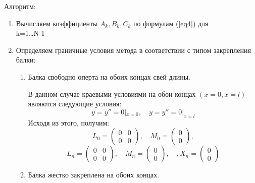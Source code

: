 	\bigskip\quad Алгоритм:
	\begin{enumerate}
		\item Вычисляем коэффициенты \(A_k,B_k,C_k\) по формулам (\ref{eq4}) для\\ k=1\ldots N-1
		\item Определяем граничные условия метода в соответствии с типом закрепления балки:
		\begin{enumerate}
			\item Балка свободно оперта на обоих концах свей длины.
			
			В данном случае краевыми условиями на обои концах \((x=0,x=l)\) являются следующие условия:
			\begin{equation*}
			y=y''=0|_{x=0}, \quad y=y''=0|_{x=l}
			\end{equation*}
			Исходя из этого, получим:
			\begin{equation*}
			L_0=\left( \begin{matrix}0&0\\0&0\end{matrix} \right),\quad
			M_0=\left( \begin{matrix}0\\0\end{matrix} \right),
			\end{equation*}
			\begin{equation*}
			L_n=\left( \begin{matrix}0&0\\0&0\end{matrix} \right),\quad
			M_n=\left( \begin{matrix}0\\0\end{matrix} \right),\quad,
			X_n=\left( \begin{matrix}0\\0\end{matrix} \right)
			\end{equation*}
			\item Балка жестко закреплена на обоих концах.\\
		

\end{enumerate}
\end{enumerate}
